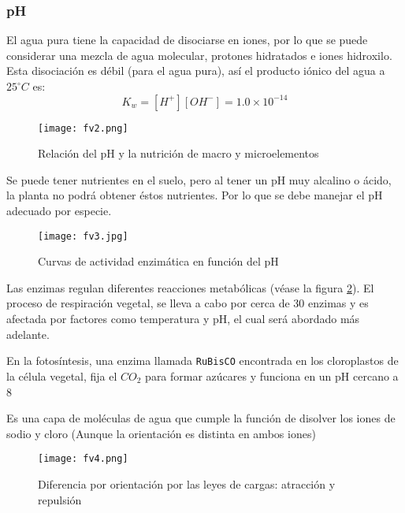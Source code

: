 \subsubsection{pH}
El agua pura tiene la capacidad de disociarse en iones, por lo que se puede considerar una mezcla de agua molecular, protones hidratados e iones hidroxilo.
Esta disociación es débil (para el agua pura), así el producto iónico del agua a $25^{\circ}C$ es: 
\begin{equation}
    K_w=[H^+][OH^-]=1.0\times 10^{-14}
\end{equation}

\begin{figure}[h!]
    \centerline{\texttt{[image: fv2.png]}}
    \caption{Relación del pH y la nutrición de macro y microelementos}
    \label{fav2}
  \end{figure}

Se puede tener nutrientes en el suelo, pero al tener un pH muy alcalino o ácido, la planta no podrá obtener éstos nutrientes. Por lo que se debe manejar el pH adecuado por especie.

\begin{figure}[h!]
    \centerline{\texttt{[image: fv3.jpg]}}
    \caption{Curvas de actividad enzimática en función del pH}
    \label{fav3}
  \end{figure}

Las enzimas regulan diferentes reacciones metabólicas (véase la figura \ref{fav3}). El proceso de respiración vegetal, se lleva a cabo por cerca de 30 enzimas y es afectada por factores como temperatura y pH, el cual será abordado más adelante.


En la fotosíntesis, una enzima llamada \texttt{RuBisCO} encontrada en los cloroplastos de la célula vegetal, fija el $CO_2$ para formar azúcares y funciona en un pH cercano a 8

\begin{definition}
    Es una capa de moléculas de agua que cumple la función de disolver los iones de sodio y cloro (Aunque la orientación es distinta en ambos iones)
\end{definition}

\begin{figure}[h!]
    \centerline{\texttt{[image: fv4.png]}}
    \caption{Diferencia por orientación por las leyes de cargas: atracción y repulsión}
    \label{fav4}
  \end{figure}

